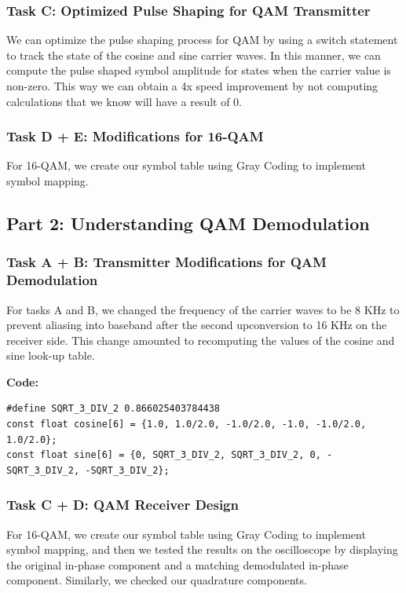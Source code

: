 \documentclass{article}
\begin{document}
\subsubsection{Task C: Optimized Pulse Shaping for QAM Transmitter}
We can optimize the pulse shaping process for QAM by using a switch statement to track the state of the cosine and sine carrier waves. In this manner, we can compute the pulse shaped symbol amplitude for states when the carrier value is non-zero. This way we can obtain a 4x speed improvement by not computing calculations that we know will have a result of 0.

\subsubsection{Task D + E: Modifications for 16-QAM}
For 16-QAM, we create our symbol table using Gray Coding to implement symbol mapping.

\subsection{Part 2: Understanding QAM Demodulation}

\subsubsection{Task A + B: Transmitter Modifications for QAM Demodulation}
For tasks A and B, we changed the frequency of the carrier waves to be 8 KHz to prevent aliasing into baseband after the second upconversion to 16 KHz on the receiver side. This change amounted to recomputing the values of the cosine and sine look-up table.

\textbf{Code:}
\begin{verbatim}
#define SQRT_3_DIV_2 0.866025403784438
const float cosine[6] = {1.0, 1.0/2.0, -1.0/2.0, -1.0, -1.0/2.0, 1.0/2.0};
const float sine[6] = {0, SQRT_3_DIV_2, SQRT_3_DIV_2, 0, -SQRT_3_DIV_2, -SQRT_3_DIV_2};
\end{verbatim}

\subsubsection{Task C + D: QAM Receiver Design}
For 16-QAM, we create our symbol table using Gray Coding to implement symbol mapping, and then we tested the results on the oscilloscope by displaying the original in-phase component and a matching demodulated in-phase component. Similarly, we checked our quadrature components.
\end{document}
